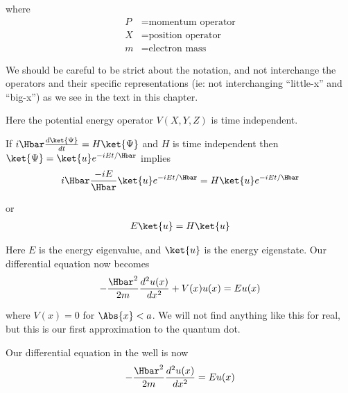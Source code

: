 {where
\begin{equation}\label{eqn:lecture9boundStates:60}
\begin{aligned}
P &= \text{momentum operator} \\
X &= \text{position operator} \\
m &= \text{electron mass}
\end{aligned}
\end{equation}

We should be careful to be strict about the notation, and not interchange the operators and their specific representations (ie: not interchanging ``little-x'' and ``big-x'') as we see in the text in this chapter.

Here the potential energy operator \(V(X,Y,Z)\) is time independent.

If \(i \Hbar \frac{d\ket{\Psi}}{dt} = H \ket{\Psi}\) and \(H\) is time independent then \(\ket{\Psi} = \ket{u} e^{-i E t/\Hbar}\) implies
%
\begin{equation}\label{eqn:lecture9boundStates:80}
\begin{aligned}
i \Hbar \frac{ -i E }{\Hbar} \ket{u} e^{-i E t/\Hbar} = H \ket{u} e^{-i E t/\Hbar}
\end{aligned}
\end{equation}

or
\begin{equation}\label{eqn:PHY356Lecture9:4}
\begin{aligned}
E \ket{u} = H \ket{u}
\end{aligned}
\end{equation}

Here \(E\) is the energy eigenvalue, and \(\ket{u}\) is the energy eigenstate.  Our differential equation now becomes
%
\begin{equation}\label{eqn:PHY356Lecture9:5}
\begin{aligned}
-\frac{\Hbar^2 }{2m} \frac{d^2 u(x)}{dx^2} + V(x) u(x) = E u(x)
\end{aligned}
\end{equation}

where \(V(x) = 0\) for \(\Abs{x} < a\).  We will not find anything like this for real, but this is our first approximation to the quantum dot.

Our differential equation in the well is now
%
\begin{equation}\label{eqn:PHY356Lecture9:6}
\begin{aligned}
-\frac{\Hbar^2 }{2m} \frac{d^2 u(x)}{dx^2} = E u(x)
\end{aligned}
\end{equation}

}
